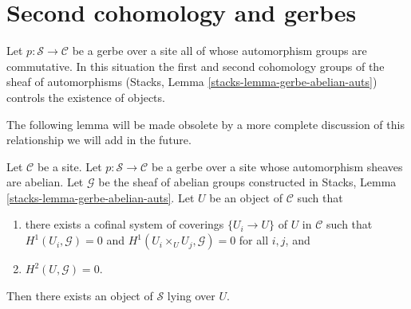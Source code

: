 \section{Second cohomology and gerbes}
\label{section-gerbes}

\noindent
Let $p : \mathcal{S} \to \mathcal{C}$ be a gerbe over a site
all of whose automorphism groups are commutative. In this situation
the first and second cohomology groups of the sheaf of automorphisms
(Stacks, Lemma \ref{stacks-lemma-gerbe-abelian-auts})
controls the existence of objects.

\medskip\noindent
The following lemma will be made obsolete by a more complete
discussion of this relationship we will add in the future.

\begin{lemma}
\label{lemma-existence}
Let $\mathcal{C}$ be a site. Let $p : \mathcal{S} \to \mathcal{C}$
be a gerbe over a site whose automorphism sheaves are abelian.
Let $\mathcal{G}$ be the sheaf of abelian groups constructed
in Stacks, Lemma \ref{stacks-lemma-gerbe-abelian-auts}.
Let $U$ be an object of $\mathcal{C}$ such that
\begin{enumerate}
\item there exists a cofinal system of coverings $\{U_i \to U\}$
of $U$ in $\mathcal{C}$ such that $H^1(U_i, \mathcal{G}) = 0$ and
$H^1(U_i \times_U U_j, \mathcal{G}) = 0$
for all $i, j$, and
\item $H^2(U, \mathcal{G}) = 0$.
\end{enumerate}
Then there exists an object of $\mathcal{S}$ lying over $U$.
\end{lemma}

